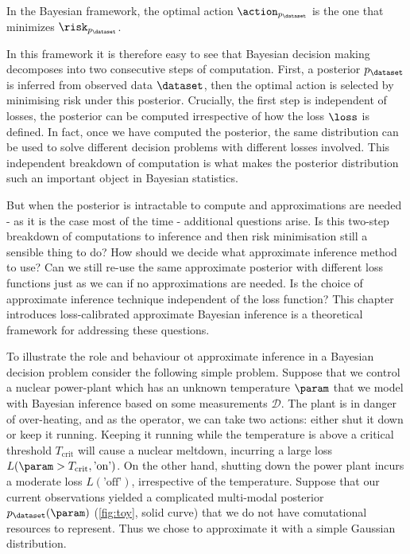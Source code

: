 In the Bayesian framework, the optimal action $\action_{p_\dataset}$ is the one that minimizes $\risk_{p_\dataset}$.

In this framework it is therefore easy to see that Bayesian decision making decomposes into two consecutive steps of computation. First, a posterior $p_\dataset$ is inferred from observed data $\dataset$, then the optimal action is selected by minimising risk under this posterior. Crucially, the first step is independent of losses, the posterior can be computed irrespective of how the loss $\loss$ is defined. In fact, once we have computed the posterior, the same distribution can be used to solve different decision problems with different losses involved. This independent breakdown of computation is what makes the posterior distribution such an important object in Bayesian statistics.

But when the posterior is intractable to compute and approximations are needed - as it is the case most of the time - additional questions arise. Is this two-step breakdown of computations to inference and then risk minimisation still a sensible thing to do? How should we decide what approximate inference method to use? Can we still re-use the same approximate posterior with different loss functions just as we can if no approximations are needed. Is the choice of approximate inference technique independent of the loss function? This chapter introduces loss-calibrated approximate Bayesian inference is a theoretical framework for addressing these questions.

To illustrate the role and behaviour ot approximate inference in a Bayesian decision problem consider the following simple problem. Suppose that we control a nuclear power-plant which has an unknown temperature $\param$ that we model with Bayesian inference based on some measurements $\mathcal{D}$.
The plant is in danger of over-heating, and as the operator, we can take two actions: either shut it down or keep it running. Keeping it running while the temperature is above a critical threshold $T_\mathrm{crit}$ will cause a nuclear meltdown, incurring a large loss $L(\param>T_\mathrm{crit},\mbox{'on'})$. On the other hand, shutting down the power plant incurs a moderate loss $L(\mbox{'off'})$, irrespective of the temperature. 
Suppose that our current observations yielded a complicated multi-modal posterior $p_\dataset(\param)$ (\ref{fig:toy}, solid curve) that we do not have comutational resources to represent. Thus we chose to approximate it with a simple Gaussian distribution.

